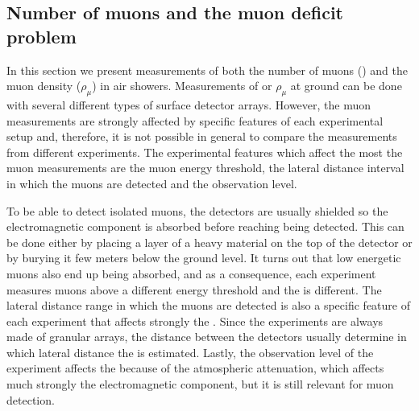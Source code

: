\subsection{Number of muons and the muon deficit problem}
\label{sec:shower:observables:nmu}

In this section we present measurements of both the number of muons (\nmu)
and the muon density ($\rho_\mu$) in air showers.
Measurements of \nmu or $\rho_\mu$ at ground can
be done with several different types of surface detector arrays.
However, the muon measurements are strongly affected by specific features
of each experimental setup and, therefore, it is not possible in general
to compare the measurements from different experiments. The experimental features
which affect the most the muon measurements are the muon energy threshold,
the lateral distance interval in which the muons are detected and the observation
level. 

To be able to detect isolated muons, the detectors are usually shielded so the
electromagnetic component is absorbed before reaching being detected. This can
be done either by placing a layer of a heavy material on the top of the detector
or by burying it few meters below the ground level. It turns out that low energetic muons
also end up being absorbed, and as a consequence, each experiment measures
muons above a different energy threshold and the \nmu is different.
The lateral distance range in which the muons are detected is also
a specific feature of each experiment that affects strongly the \nmu. Since
the experiments are always made of granular arrays, the distance between the detectors
usually determine in which lateral distance the \nmu is estimated. Lastly,
the observation level of the experiment affects the \nmu because of the atmospheric attenuation,
which affects much strongly the electromagnetic component, but it is still relevant for
muon detection.

